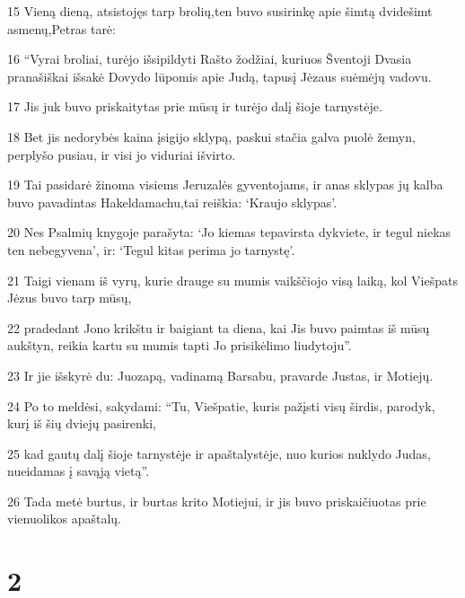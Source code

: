 \par 15 Vieną dieną, atsistojęs tarp brolių,­ten buvo susirinkę apie šimtą dvidešimt asmenų,­Petras tarė: 
\par 16 “Vyrai broliai, turėjo išsipildyti Rašto žodžiai, kuriuos Šventoji Dvasia pranašiškai išsakė Dovydo lūpomis apie Judą, tapusį Jėzaus suėmėjų vadovu. 
\par 17 Jis juk buvo priskaitytas prie mūsų ir turėjo dalį šioje tarnystėje. 
\par 18 Bet jis nedorybės kaina įsigijo sklypą, paskui stačia galva puolė žemyn, perplyšo pusiau, ir visi jo viduriai išvirto. 
\par 19 Tai pasidarė žinoma visiems Jeruzalės gyventojams, ir anas sklypas jų kalba buvo pavadintas Hakeldamachu,­tai reiškia: ‘Kraujo sklypas’. 
\par 20 Nes Psalmių knygoje parašyta: ‘Jo kiemas tepavirsta dykviete, ir tegul niekas ten nebegyvena’, ir: ‘Tegul kitas perima jo tarnystę’. 
\par 21 Taigi vienam iš vyrų, kurie drauge su mumis vaikščiojo visą laiką, kol Viešpats Jėzus buvo tarp mūsų, 
\par 22 pradedant Jono krikštu ir baigiant ta diena, kai Jis buvo paimtas iš mūsų aukštyn, reikia kartu su mumis tapti Jo prisikėlimo liudytoju”. 
\par 23 Ir jie išskyrė du: Juozapą, vadinamą Barsabu, pravarde Justas, ir Motiejų. 
\par 24 Po to meldėsi, sakydami: “Tu, Viešpatie, kuris pažįsti visų širdis, parodyk, kurį iš šių dviejų pasirenki, 
\par 25 kad gautų dalį šioje tarnystėje ir apaštalystėje, nuo kurios nuklydo Judas, nueidamas į savąją vietą”. 
\par 26 Tada metė burtus, ir burtas krito Motiejui, ir jis buvo priskaičiuotas prie vienuolikos apaštalų.


\chapter{2}


